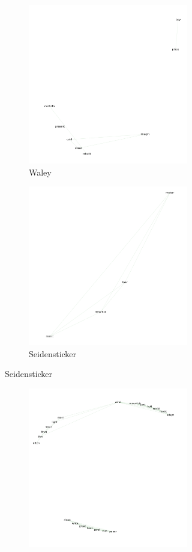 \documentclass[12pt]{article}
\begin{document}
\begin{flushleft}
\begin{spacing}{2.0}
\begin{figure}
	\begin{subfigure}{\linewidth}
		\begin{subfigure}{.5\linewidth}
			\includegraphics[width=3in]{waley-no-womenwords.png}
			\caption{Waley}		
	  	\end{subfigure}
	  	\begin{subfigure}{.5\linewidth}
			\includegraphics[width=3in]{seidensticker-no-womenwords.png}\hfill
			\caption{Seidensticker}
	  	\end{subfigure}
	\end{subfigure}\par\medskip
	\begin{subfigure}{\linewidth}	  	
		\begin{subfigure}{.5\linewidth}
	  		\includegraphics[width=3in]{tyler-no-womenwords.png}\hfill

\end{subfigure}
\end{subfigure}
\end{figure}
\end{spacing}
\end{flushleft}
\end{document}

